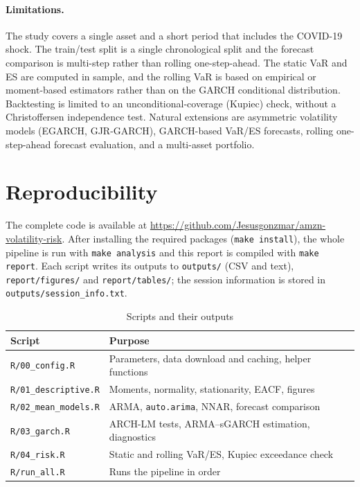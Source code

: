 \documentclass[11pt,a4paper]{article}
\newcommand{\repourl}{https://github.com/Jesusgonzmar/amzn-volatility-risk}
\begin{document}
\paragraph{Limitations.} The study covers a single asset and a short period that includes the COVID-19 shock. The train/test split is a single chronological split and the forecast comparison is multi-step rather than rolling one-step-ahead. The static VaR and ES are computed in sample, and the rolling VaR is based on empirical or moment-based estimators rather than on the GARCH conditional distribution. Backtesting is limited to an unconditional-coverage (Kupiec) check, without a Christoffersen independence test. Natural extensions are asymmetric volatility models (EGARCH, GJR-GARCH), GARCH-based VaR/ES forecasts, rolling one-step-ahead forecast evaluation, and a multi-asset portfolio.

\appendix
\section{Reproducibility}\label{app:repro}
The complete code is available at \url{\repourl}. After installing the required packages (\texttt{make install}), the whole pipeline is run with \texttt{make analysis} and this report is compiled with \texttt{make report}. Each script writes its outputs to \texttt{outputs/} (CSV and text), \texttt{report/figures/} and \texttt{report/tables/}; the session information is stored in \texttt{outputs/session\_info.txt}.

\begin{table}[htbp]
\centering
\caption{Scripts and their outputs}
\begin{tabular}{ll}
\toprule
Script & Purpose \\
\midrule
\texttt{R/00\_config.R} & Parameters, data download and caching, helper functions \\
\texttt{R/01\_descriptive.R} & Moments, normality, stationarity, EACF, figures \\
\texttt{R/02\_mean\_models.R} & ARMA, \texttt{auto.arima}, NNAR, forecast comparison \\
\texttt{R/03\_garch.R} & ARCH-LM tests, ARMA--sGARCH estimation, diagnostics \\
\texttt{R/04\_risk.R} & Static and rolling VaR/ES, Kupiec exceedance check \\
\texttt{R/run\_all.R} & Runs the pipeline in order \\
\bottomrule
\end{tabular}
\end{table}
\end{document}
